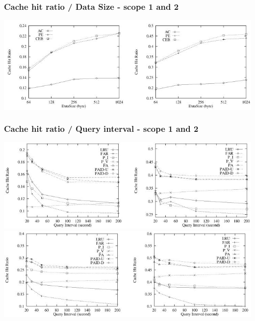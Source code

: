 \begin{frame}
\frametitle{Cache hit ratio / Data Size - scope 1 and 2}

\begin{center}
\includegraphics[scale=0.6]{images/fig5.jpg}
\end{center}

\end{frame}

\begin{frame}
\frametitle{Cache hit ratio / Query interval - scope 1 and 2}

\includegraphics[scale=0.5]{images/fig6.jpg}\\
\includegraphics[scale=0.5]{images/fig7.jpg}


\end{frame}

